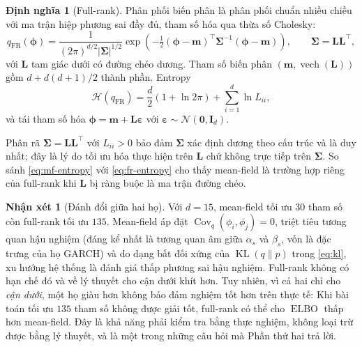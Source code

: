\documentclass[12pt,a4paper]{article}
\numberwithin{equation}{section}
\theoremstyle{definition}
\newtheorem{definition}{Định nghĩa}[section]
\newtheorem{remark}{Nhận xét}[section]
\newcommand{\Cov}{\operatorname{Cov}}
\newcommand{\KL}{\operatorname{KL}}
\newcommand{\ELBO}{\operatorname{ELBO}}
\newcommand{\vecphi}{\symbf{\phi}}
\newcommand{\vech}{\operatorname{vech}}
\begin{document}
	\begin{definition}[Full-rank]\label{def:fr}
		Phân phối biến phân là phân phối chuẩn nhiều chiều với ma trận hiệp phương sai đầy đủ, tham số
		hóa qua thừa số Cholesky:
		\begin{equation}
			q_{\mathrm{FR}}(\vecphi)
			=\frac{1}{(2\pi)^{d/2}\left|\symbf\Sigma\right|^{1/2}}
			\exp\!\left(-\tfrac{1}{2}\left(\vecphi-\symbf m\right)^{\top}
			\symbf\Sigma^{-1}\left(\vecphi-\symbf m\right)\right),
			\qquad \symbf\Sigma=\symbf L\symbf L^{\top},
			\label{eq:full-rank}
		\end{equation}
		với $\symbf L$ tam giác dưới có đường chéo dương. Tham số biến phân
		$(\symbf m,\vech(\symbf L))$ gồm $d+d(d+1)/2$ thành phần. Entropy
		\begin{equation}
			\mathcal{H}(q_{\mathrm{FR}})=\frac{d}{2}\left(1+\ln 2\pi\right)+\sum_{i=1}^{d}\ln L_{ii},
			\label{eq:fr-entropy}
		\end{equation}
		và tái tham số hóa $\vecphi=\symbf m+\symbf L\symbf\varepsilon$ với
		$\symbf\varepsilon\sim\mathcal{N}(\symbf 0,\symbf I_d)$.
	\end{definition}
	
	Phân rã $\symbf\Sigma=\symbf L\symbf L^{\top}$ với $L_{ii}>0$ bảo đảm $\symbf\Sigma$ xác
	định dương theo cấu trúc và là duy nhất; đây là lý do tối ưu hóa thực hiện trên
	$\symbf L$ chứ không trực tiếp trên $\symbf\Sigma$. So sánh \eqref{eq:mf-entropy} với
	\eqref{eq:fr-entropy} cho thấy mean-field là trường hợp riêng của full-rank khi
	$\symbf L$ bị ràng buộc là ma trận đường chéo.
	
	\begin{remark}[Đánh đổi giữa hai họ]\label{rem:mf-vs-fr}
		Với $d=15$, mean-field tối ưu $30$ tham số còn full-rank tối ưu $135$. Mean-field áp đặt
		$\Cov_q(\phi_i,\phi_j)=0$, triệt tiêu tương quan hậu nghiệm (đáng kể nhất là tương quan âm giữa $\alpha_s$ và $\beta_s$, vốn là đặc trưng của họ GARCH) và do dạng bất đối
		xứng của $\KL(q\|p)$ trong \eqref{eq:kl}, xu hướng hệ thống là đánh giá thấp phương sai
		hậu nghiệm. Full-rank không có hạn chế đó và về lý thuyết cho cận dưới khít hơn. Tuy
		nhiên, vì cả hai chỉ cho \emph{cận dưới}, một họ giàu hơn không bảo đảm nghiệm tốt hơn
		trên thực tế: Khi bài toán tối ưu $135$ tham số không được giải tốt, full-rank có thể cho
		$\ELBO$ thấp hơn mean-field. Đây là khả năng phải kiểm tra bằng thực nghiệm, không loại
		trừ được bằng lý thuyết, và là một trong những câu hỏi mà Phần thứ hai trả lời.
	\end{remark}
	
\end{document}
